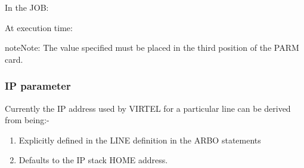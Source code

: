 \documentclass[letterpaper,10pt,english]{sphinxmanual}
\begin{document}
In the JOB:

\begin{sphinxVerbatim}[commandchars=\\\{\}]
  
\end{sphinxVerbatim}

At execution time:

\begin{sphinxVerbatim}[commandchars=\\\{\}]
         
            
   
       
         
\end{sphinxVerbatim}

\begin{sphinxadmonition}{note}{Note:}
The value specified must be placed in the third position of the PARM card.
\end{sphinxadmonition}


\subsubsection{IP parameter}
\label{\detokenize{Installation_Guide:index-14}}\label{\detokenize{Installation_Guide:ip-parameter}}
Currently the IP address used by VIRTEL for a particular line can be derived from being:-
\begin{enumerate}
\item {} 
Explicitly defined in the LINE definition in the ARBO statements

\item {} 
Defaults to the IP stack HOME address.

\end{enumerate}
\end{document}
